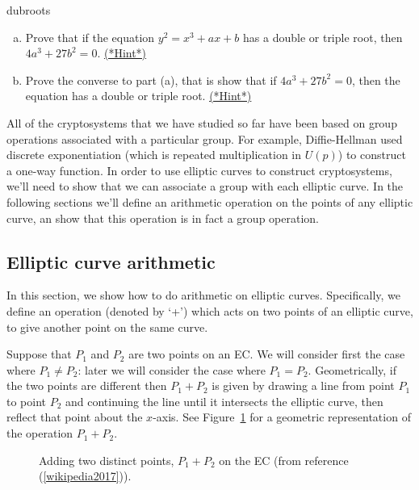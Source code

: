 \begin{exercise}{dubroots}
		\begin{enumerate}[(a)] 
	\item  Prove that if the equation $y^2 = x^3 + ax + b$ has a double or triple root, then $4a^3+27b^2=0$. 
\hyperref[sec:FurtherCryptography:Hints]{(*Hint*)}
	\item Prove the converse to part (a), that is show that if $4a^3 + 27b ^2=0$, then the equation has a double or triple root. \hyperref[sec:FurtherCryptography:Hints]{(*Hint*)}
\end {enumerate} 
\end{exercise}

All of the cryptosystems that we have studied so far have been based on group operations associated with a particular group. For example, Diffie-Hellman used discrete exponentiation (which is repeated multiplication in $U(p)$) to construct a one-way function. In order to  use elliptic curves to construct cryptosystems, we'll need to show that we can associate a group with each elliptic curve. In the following sections we'll define an arithmetic operation on the points of  any  elliptic curve, an  show that this operation is in fact a group operation.

\subsection{Elliptic curve arithmetic}
\label{subsec:FurtherCryptography:EllipticalCurve:ECA}

In this section, we show how to do arithmetic on elliptic curves. Specifically, we define an operation (denoted by `+') which acts on two points of an elliptic curve, to give another point on the same curve. 

Suppose that $P_1$ and $P_2$ are two points on an EC. We will consider first the case where $P_1 \neq P_2$: later we will consider the case where  $P_1= P_2$. Geometrically, if the two points are different then $P_1 + P_2$ is given by drawing a line from point $P_1$ to point $P_2$ and continuing the line until it intersects the elliptic curve, then reflect that point about the $x$-axis.  See Figure~\ref{fig:DH:DHKE_6} for a geometric representation of the operation $P_1+P_2$.

\begin{figure}[htbp]
	  \caption{\label{fig:DH:DHKE_6}Adding two distinct points, $P_1 + P_2$ on the EC (from reference (\ref{wikipedia2017})).}
\end{figure}


